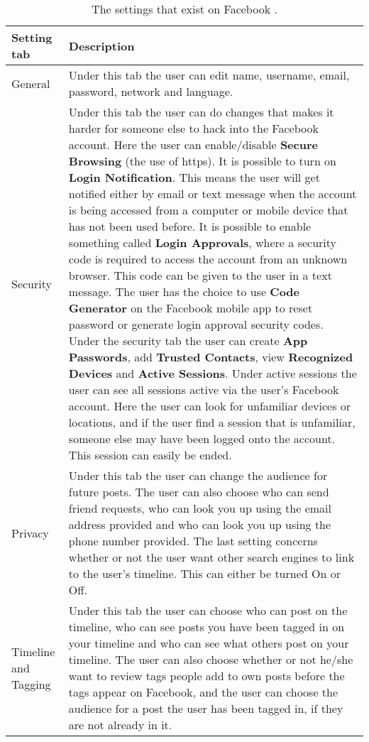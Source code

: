 \begin{center}
    \begin{longtable}{ | l | p{9cm} |}
    \caption{\label{tab:settings}The settings that exist on Facebook 				\cite{facebooksettings}.} \\
    \hline
    \textbf{Setting tab} & \textbf{Description} \\ 
    \hline
    General & Under this tab the user can edit name, username, email, password, network and language. \\
    \hline
    Security & Under this tab the user can do changes that makes it harder for someone else to hack into the Facebook account. Here the user can enable/disable \textbf{Secure Browsing} (the use of https). It is possible to turn on \textbf{Login Notification}. This means the user will get notified either by email or text message when the account is being accessed from a computer or mobile device that has not been used before. It is possible to enable something called \textbf{Login Approvals}, where a security code is required to access the account from an unknown browser. This code can be given to the user in a text message. The user has the choice to use \textbf{Code Generator} on the Facebook mobile app to reset password or generate login approval security codes. Under the security tab the user can create \textbf{App Passwords}, add \textbf{Trusted Contacts}, view \textbf{Recognized Devices} and \textbf{Active Sessions}. Under active sessions the user can see all sessions active via the user's Facebook account. Here the user can look for unfamiliar devices or locations, and if the user find a session that is unfamiliar, someone else may have been logged onto the account. This session can easily be ended. \\ 
    \hline
    Privacy & Under this tab the user can change the audience for future posts. The user can also choose who can send friend requests, who can look you up using the email address provided and who can look you up using the phone number provided. The last setting concerns whether or not the user want other search engines to link to the user's timeline. This can either be turned On or Off.\\
    \hline
    Timeline and Tagging & Under this tab the user can choose who can post on the timeline, who can see posts you have been tagged in on your timeline and who can see what others post on your timeline. The user can also choose whether or not he/she want to review tags people add to own posts before the tags appear on Facebook, and the user can choose the audience for a post the user has been tagged in, if they are not already in it.\\

\end{longtable}
\end{center}
